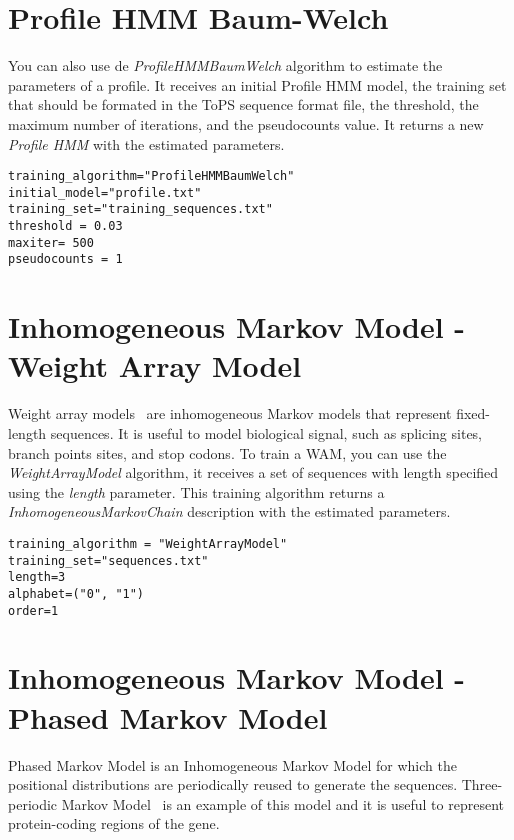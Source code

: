\section{Profile HMM Baum-Welch}

You can also use de \textit{ProfileHMMBaumWelch} algorithm to estimate the parameters of a profile. It receives an initial Profile HMM model, the training set that should be formated in the ToPS sequence format file, the threshold, the maximum number of iterations, and the pseudocounts value.
It returns a new \textit{Profile HMM} with the estimated parameters.

\begin{Verbatim}[frame=single,label=train.txt]
training_algorithm="ProfileHMMBaumWelch"
initial_model="profile.txt"
training_set="training_sequences.txt"
threshold = 0.03
maxiter= 500
pseudocounts = 1
\end{Verbatim}


\section{Inhomogeneous Markov Model - Weight Array Model}

Weight array models~\cite{Burge1997,Zhang1993} are inhomogeneous Markov models that represent fixed-length sequences. It is useful to model biological signal, such as splicing sites,  branch points sites, and stop codons. To train a WAM, you can use the \textit{WeightArrayModel} algorithm, it receives a set of sequences with length specified using the \textit{length} parameter. This training algorithm returns a \textit{InhomogeneousMarkovChain} description with the estimated parameters.

\begin{Verbatim}[frame=single,label=train.txt]
training_algorithm = "WeightArrayModel"
training_set="sequences.txt"
length=3
alphabet=("0", "1")
order=1
\end{Verbatim}

\section{Inhomogeneous Markov Model - Phased Markov Model}

Phased Markov Model is an Inhomogeneous Markov Model for which the positional distributions are periodically reused to generate the sequences. 
Three-periodic Markov Model~\cite{Borodovsky1993}  is an example of this model and it is useful to represent protein-coding regions of the gene. 

